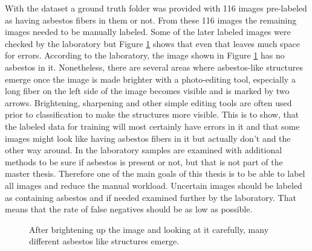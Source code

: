 With the dataset a ground truth folder was provided with 116 images pre-labeled as having asbestos fibers in them or not. From these 116 images the remaining images needed to be manually labeled. Some of the later labeled images were checked by the laboratory but Figure \ref{fig:wrong_asbestos_labeling} shows that even that leaves much space for errors.  According to the laboratory, the image shown in Figure \ref{fig:wrong_asbestos_labeling} has no asbestos in it. Nonetheless, there are several areas where asbestos-like structures emerge once the image is made brighter with a photo-editing tool, especially a long fiber on the left side of the image becomes visible and is marked by two arrows. Brightening, sharpening and other simple editing tools are often used prior to classification to make the structures more visible. This is to show, that the labeled data for training will most certainly have errors in it and that some images might look like having asbestos fibers in it but actually don't and the other way around. In the laboratory samples are examined with additional methods to be sure if asbestos is present or not, but that is not part of the master thesis. Therefore one of the main goals of this thesis is to be able to label all images and reduce the manual workload. Uncertain images should be labeled as containing asbestos and if needed examined further by the laboratory. That means that the rate of false negatives should be as low as possible.

\begin{figure}[h]
\centering
{}
\caption{After brightening up the image and looking at it carefully, many different asbestos like structures emerge.}
\label{fig:wrong_asbestos_labeling}
\end{figure}

